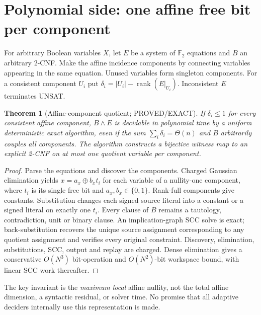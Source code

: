 \documentclass[11pt]{article}
\newtheorem{theorem}{Theorem}
\begin{document}
\section{Polynomial side: one affine free bit per component}
For arbitrary Boolean variables $X$, let $E$ be a system of $\mathbb F_2$ equations and $B$ an arbitrary 2-CNF. Make the affine incidence components by connecting variables appearing in the same equation. Unused variables form singleton components. For a consistent component $U_i$ put $\delta_i=|U_i|-\operatorname{rank}(E|_{U_i})$. Inconsistent $E$ terminates UNSAT.
\begin{theorem}[Affine-component quotient; PROVED/EXACT]
If $\delta_i\le1$ for every consistent affine component, $B\wedge E$ is decidable in polynomial time by a uniform deterministic exact algorithm, even if the sum $\sum_i\delta_i=\Theta(n)$ and $B$ arbitrarily couples all components. The algorithm constructs a bijective witness map to an explicit 2-CNF on at most one quotient variable per component.
\end{theorem}
\begin{proof}
Parse the equations and discover the components. Charged Gaussian elimination yields $x=a_x\oplus b_xt_i$ for each variable of a nullity-one component, where $t_i$ is its single free bit and $a_x,b_x\in\{0,1\}$. Rank-full components give constants. Substitution changes each signed source literal into a constant or a signed literal on exactly one $t_i$. Every clause of $B$ remains a tautology, contradiction, unit or binary clause. An implication-graph SCC solve is exact; back-substitution recovers the unique source assignment corresponding to any quotient assignment and verifies every original constraint. Discovery, elimination, substitutions, SCC, output and replay are charged. Dense elimination gives a conservative $O(N^3)$ bit-operation and $O(N^2)$-bit workspace bound, with linear SCC work thereafter.
\end{proof}
The key invariant is the \emph{maximum local} affine nullity, not the total affine dimension, a syntactic residual, or solver time. No promise that all adaptive deciders internally use this representation is made.
\end{document}
